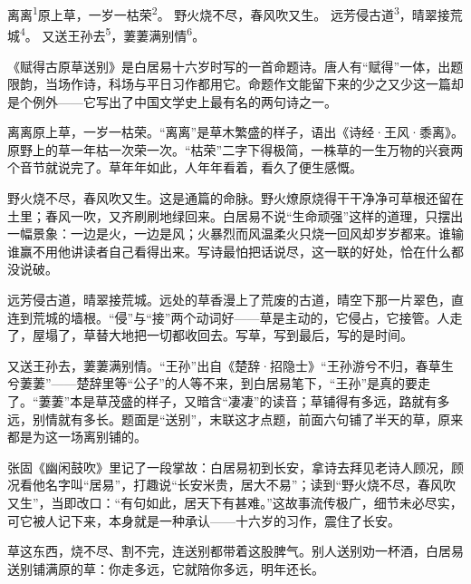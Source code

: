 
\begin{poem}
离离\textsuperscript{1}原上草，一岁一枯荣\textsuperscript{2}。
野火烧不尽，春风吹又生。
远芳侵古道\textsuperscript{3}，晴翠接荒城\textsuperscript{4}。
又送王孙去\textsuperscript{5}，萋萋满别情\textsuperscript{6}。
\end{poem}

\begin{annotations}
\end{annotations}

\begin{appreciation}
《赋得古原草送别》是白居易十六岁时写的一首命题诗。唐人有“赋得”一体，出题限韵，当场作诗，科场与平日习作都用它。命题作文能留下来的少之又少这一篇却是个例外——它写出了中国文学史上最有名的两句诗之一。

离离原上草，一岁一枯荣。“离离”是草木繁盛的样子，语出《诗经·王风·黍离》。原野上的草一年枯一次荣一次。“枯荣”二字下得极简，一株草的一生万物的兴衰两个音节就说完了。草年年如此，人年年看着，看久了便生感慨。

野火烧不尽，春风吹又生。这是通篇的命脉。野火燎原烧得干干净净可草根还留在土里；春风一吹，又齐刷刷地绿回来。白居易不说“生命顽强”这样的道理，只摆出一幅景象：一边是火，一边是风；火暴烈而风温柔火只烧一回风却岁岁都来。谁输谁赢不用他讲读者自己看得出来。写诗最怕把话说尽，这一联的好处，恰在什么都没说破。

远芳侵古道，晴翠接荒城。远处的草香漫上了荒废的古道，晴空下那一片翠色，直连到荒城的墙根。“侵”与“接”两个动词好——草是主动的，它侵占，它接管。人走了，屋塌了，草替大地把一切都收回去。写草，写到最后，写的是时间。

又送王孙去，萋萋满别情。“王孙”出自《楚辞·招隐士》“王孙游兮不归，春草生兮萋萋”——楚辞里等“公子”的人等不来，到白居易笔下，“王孙”是真的要走了。“萋萋”本是草茂盛的样子，又暗含“凄凄”的读音；草铺得有多远，路就有多远，别情就有多长。题面是“送别”，末联这才点题，前面六句铺了半天的草，原来都是为这一场离别铺的。

张固《幽闲鼓吹》里记了一段掌故：白居易初到长安，拿诗去拜见老诗人顾况，顾况看他名字叫“居易”，打趣说“长安米贵，居大不易”；读到“野火烧不尽，春风吹又生”，当即改口：“有句如此，居天下有甚难。”这故事流传极广，细节未必尽实，可它被人记下来，本身就是一种承认——十六岁的习作，震住了长安。

草这东西，烧不尽、割不完，连送别都带着这股脾气。别人送别劝一杯酒，白居易送别铺满原的草：你走多远，它就陪你多远，明年还长。
\end{appreciation}

